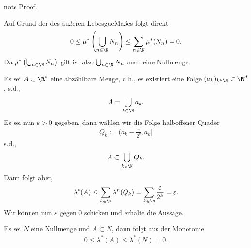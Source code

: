 \documentclass[letterpaper,10pt,german]{jupyterBook}
\begin{document}
\begin{sphinxadmonition}{note}
\sphinxAtStartPar
Proof. 

\sphinxAtStartPar
{}

\sphinxAtStartPar
Auf Grund der  des äußeren Lebesgue\sphinxhyphen{}Maßes folgt direkt
\begin{equation*}
\begin{split}0 \leq \mu^* \left( \bigcup_{n\in\N} N_n \right) \leq \sum_{n\in\N} \mu^*(N_n) = 0.\end{split}
\end{equation*}
\sphinxAtStartPar
Da \(\mu^* \left( \bigcup_{n\in\N} N_n \right)\) gilt ist also \(\bigcup_{n\in\N} N_n\) auch eine Nullmenge.

\sphinxAtStartPar
{}

\sphinxAtStartPar
Es sei \(A\subset\R^d\) eine abzählbare Menge, d.h., es existiert eine Folge \((a_k)_{k\in\N}\subset\R^d\), s.d.,
\begin{equation*}
\begin{split}A = \bigcup_{k\in\N} a_k.\end{split}
\end{equation*}
\sphinxAtStartPar
Es sei nun \(\varepsilon>0\) gegeben, dann wählen wir die Folge halboffener Quader
\begin{equation*}
\begin{split}Q_k := (a_k - \frac{\varepsilon}{2^k},a_k]\end{split}
\end{equation*}
\sphinxAtStartPar
s.d.,
\begin{equation*}
\begin{split}A\subset \bigcup_{k\in\N} Q_k.\end{split}
\end{equation*}
\sphinxAtStartPar
Dann folgt aber,
\begin{equation*}
\begin{split}\lambda^\ast(A) \leq \sum_{k\in\N} \lambda^n(Q_k) = \sum_{k\in\N} \frac{\varepsilon}{2^k} = \varepsilon.\end{split}
\end{equation*}
\sphinxAtStartPar
Wir können nun \(\varepsilon\) gegen 0 schicken und erhalte die Aussage.

\sphinxAtStartPar
{}

\sphinxAtStartPar
Es sei \(N\) eine Nullmenge und \(A\subset N\), dann folgt aus der Monotonie
\begin{equation*}
\begin{split}0\leq \lambda^\ast(A)\leq \lambda^\ast(N) = 0.\end{split}
\end{equation*}\end{sphinxadmonition}
\end{document}
